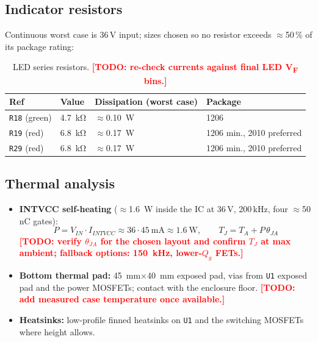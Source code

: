 \documentclass[11pt,a4paper]{article}
\newcommand{\todo}[1]{\textcolor{red}{\textbf{[TODO: #1]}}}
\newcommand{\comp}[1]{\texttt{#1}}                 %
\begin{document}
\subsection{Indicator resistors}
Continuous worst case is 36\,V input; sizes chosen so no resistor exceeds
$\approx$50\,\% of its package rating:
\begin{table}[H]
  \centering
  \begin{tabular}{@{}llll@{}}
    \toprule
    \textbf{Ref} & \textbf{Value} & \textbf{Dissipation (worst case)} & \textbf{Package} \\
    \midrule
    \comp{R18} (green)   & \SI{4.7}{\kilo\ohm} & $\approx$\SI{0.10}{\W} & 1206 \\
    \comp{R19} (red)     & \SI{6.8}{\kilo\ohm} & $\approx$\SI{0.17}{\W} & 1206 min., 2010 preferred \\
    \comp{R29} (red)     & \SI{6.8}{\kilo\ohm} & $\approx$\SI{0.17}{\W} & 1206 min., 2010 preferred \\
    \bottomrule
  \end{tabular}
  \caption{LED series resistors. \todo{re-check currents against final LED V\textsubscript{F} bins.}}
\end{table}

\subsection{Thermal analysis}
\begin{itemize}[nosep]
  \item \textbf{INTVCC self-heating} ($\approx$\SI{1.6}{\W} inside the IC at
        36\,V, 200\,kHz, four $\approx$50\,nC gates):
        \begin{equation}
          P = V_{IN} \cdot I_{INTVCC} \approx 36 \cdot \SI{45}{\mA} \approx \SI{1.6}{\W},
          \qquad T_J = T_A + P\,\theta_{JA}
        \end{equation}
        \todo{verify $\theta_{JA}$ for the chosen layout and confirm $T_J$ at max
        ambient; fallback options: \SI{150}{\kHz}, lower-$Q_g$ FETs.}
  \item \textbf{Bottom thermal pad:} \SI{45}{\mm}$\times$\SI{40}{\mm} exposed pad,
        vias from \comp{U1} exposed pad and the power MOSFETs; contact with the
        enclosure floor. \todo{add measured case temperature once available.}
  \item \textbf{Heatsinks:} low-profile finned heatsinks on \comp{U1} and the
        switching MOSFETs where height allows.
\end{itemize}
\end{document}
